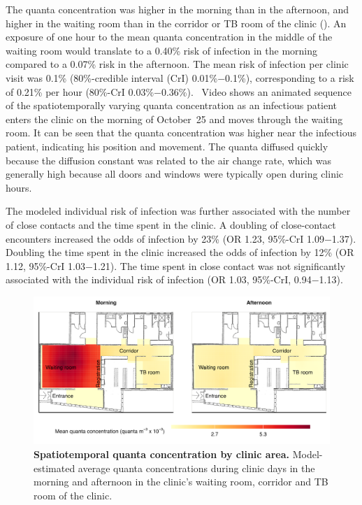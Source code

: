 \documentclass[fleqn,11pt]{wlscirep}
\begin{document}
The quanta concentration was higher in the morning than in the afternoon, and higher in the waiting room than in the corridor or TB room of the clinic (). An exposure of one hour to the mean quanta concentration in the middle of the waiting room would translate to a 0.40\% risk of infection in the morning compared to a 0.07\% risk in the afternoon. The mean risk of infection per clinic visit was 0.1\% (80\%-credible interval (CrI) 0.01\%$-$0.1\%), corresponding to a risk of 0.21\% per hour (80\%-CrI 0.03\%$-$0.36\%). \supp~Video shows an animated sequence of the spatiotemporally varying quanta concentration as an infectious patient enters the clinic on the morning of October~25 and moves through the waiting room. It can be seen that the quanta concentration was higher near the infectious patient, indicating his position and movement. The quanta diffused quickly because the diffusion constant was related to the air change rate, which was generally high because all doors and windows were typically open during clinic hours.

The modeled individual risk of infection was further associated with the number of close contacts and the time spent in the clinic. A doubling of close-contact encounters increased the odds of infection by 23\% (OR 1.23, 95\%-CrI 1.09$-$1.37). Doubling the time spent in the clinic increased the odds of infection by 12\% (OR 1.12, 95\%-CrI 1.03$-$1.21). The time spent in close contact was not significantly associated with the individual risk of infection (OR 1.03, 95\%-CrI, 0.94$-$1.13). 

\begin{figure}
    \centering
    \includegraphics{results/modeling/mean-quanta-concentration.png}
    \caption{\textbf{Spatiotemporal quanta concentration by clinic area.} Model-estimated average quanta concentrations during clinic days in the morning and afternoon in the clinic's waiting room, corridor and TB room of the clinic.}
    \label{fig:main-modeling-results}
\end{figure}
\end{document}
